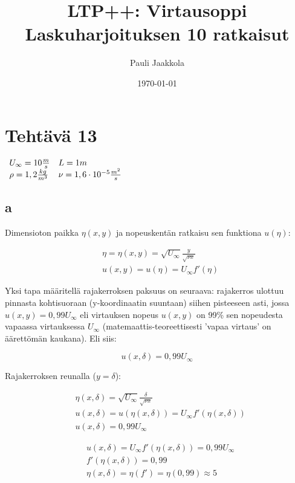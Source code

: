 \documentclass[12pt,a4paper,finnish]{article}
\title{LTP++: Virtausoppi\\Laskuharjoituksen 10 ratkaisut}
\date{\today}
\author{Pauli Jaakkola}
\begin{document}
\maketitle
\tableofcontents
\newpage

\section{Tehtävä 13}

\begin{math}
 \begin{array}{l l}
  U_{\infty} = 10 \frac{m}{s} & L = 1m\\
  \rho = 1,2 \frac{kg}{m^3} & \nu = 1,6\cdot10^{-5}\frac{m^2}{s}
 \end{array}
\end{math}

\subsection{a}

Dimensioton paikka $\eta(x, y)$ ja nopeuskentän ratkaisu sen funktiona $u(\eta)$:

\begin{align}
 &\eta = \eta(x, y) = \sqrt{U_{\infty}}\frac{y}{\sqrt{\nu x}}\\
 &u(x, y) = u(\eta) = U_{\infty}f'(\eta)
\end{align}

Yksi tapa määritellä rajakerroksen paksuus on seuraava: rajakerros ulottuu pinnasta kohtisuoraan 
(y-koordinaatin suuntaan) siihen pisteeseen asti, jossa $u(x, y) = 0,99U_{\infty}$ eli virtauksen 
nopeus $u(x,y)$ on 99\% sen nopeudesta vapaassa virtauksessa $U_{\infty}$ (matemaattis-teoreettisesti 
'vapaa virtaus' on äärettömän kaukana). Eli siis:

\begin{equation}
 u(x, \delta) = 0,99U_{\infty}
\end{equation}

Rajakerroksen reunalla ($y = \delta$):

\begin{align}
 &\eta(x, \delta) = \sqrt{U_{\infty}}\frac{\delta}{\sqrt{\nu x}}\\
 &u(x, \delta) = u(\eta(x, \delta)) = U_{\infty}f'(\eta(x, \delta))\\
 &u(x, \delta) = 0,99U_{\infty} 
\end{align}

\begin{align}
 &u(x, \delta) = U_{\infty}f'(\eta(x, \delta)) = 0,99U_{\infty}\\
 &f'(\eta(x, \delta)) = 0,99\\
 &\eta(x, \delta) = \eta(f') = \eta(0,99) \approx 5
\end{align}
\end{document}
